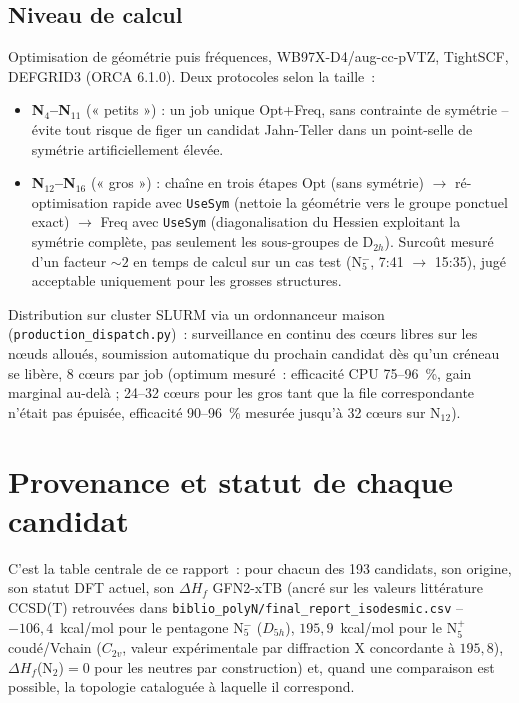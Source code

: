 \documentclass[11pt,a4paper]{article}
\begin{document}
\subsection{Niveau de calcul}

Optimisation de g\'eom\'etrie puis fr\'equences, WB97X-D4/aug-cc-pVTZ,
TightSCF, DEFGRID3 (ORCA 6.1.0). Deux protocoles selon la taille~:

\begin{itemize}[leftmargin=1.4em]
  \item \textbf{N$_4$--N$_{11}$} (« petits ») : un job unique Opt+Freq,
  sans contrainte de sym\'etrie -- \'evite tout risque de figer un
  candidat Jahn-Teller dans un point-selle de sym\'etrie artificiellement
  \'elev\'ee.
  \item \textbf{N$_{12}$--N$_{16}$} (« gros ») : cha\^ine en trois \'etapes
  Opt (sans sym\'etrie) $\to$ r\'e-optimisation rapide avec \texttt{UseSym}
  (nettoie la g\'eom\'etrie vers le groupe ponctuel exact) $\to$ Freq avec
  \texttt{UseSym} (diagonalisation du Hessien exploitant la sym\'etrie
  compl\`ete, pas seulement les sous-groupes de D$_{2h}$). Surco\^ut mesur\'e
  d'un facteur ${\sim}2$ en temps de calcul sur un cas test (N$_5^-$,
  7:41 $\to$ 15:35), jug\'e acceptable uniquement pour les grosses
  structures.
\end{itemize}

Distribution sur cluster SLURM via un ordonnanceur maison
(\texttt{production\_dispatch.py})~: surveillance en continu des c\oe urs
libres sur les n\oe uds allou\'es, soumission automatique du prochain
candidat d\`es qu'un cr\'eneau se lib\`ere, 8 c\oe urs par job (optimum
mesur\'e~: efficacit\'e CPU 75--96~\%, gain marginal au-del\`a ; 24--32
c\oe urs pour les gros tant que la file correspondante n'\'etait pas
\'epuis\'ee, efficacit\'e 90--96~\% mesur\'ee jusqu'\`a 32 c\oe urs sur
N$_{12}$).



\section{Provenance et statut de chaque candidat}
\label{sec:provenance}

C'est la table centrale de ce rapport~: pour chacun des 193 candidats,
son origine, son statut DFT actuel, son $\Delta H_f$ GFN2-xTB (ancr\'e sur
les valeurs litt\'erature CCSD(T) retrouv\'ees dans
\texttt{biblio\_polyN/final\_report\_isodesmic.csv} -- $-106{,}4$~kcal/mol
pour le pentagone N$_5^-$ ($D_{5h}$), $195{,}9$~kcal/mol pour le N$_5^+$
coud\'e/Vchain ($C_{2v}$, valeur exp\'erimentale par diffraction X
concordante \`a $195{,}8$), $\Delta H_f$(N$_2$)$=0$ pour les neutres par
construction) et, quand une comparaison est possible, la topologie
catalogu\'ee \`a laquelle il correspond.
\end{document}
